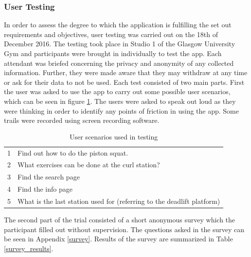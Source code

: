 \documentclass{l4proj}
\begin{document}
\subsubsection{User Testing}
In order to assess the degree to which the application is fulfilling the set out requirements and objectives, user testing was carried out on the 18th of December 2016. The testing took place in Studio 1 of the Glasgow University Gym and participants were brought in individually to test the app. Each attendant was briefed concerning the privacy and anonymity of any collected information. Further, they were made aware that they may withdraw at any time or ask for their data to not be used. Each test consisted of two main parts. First the user was asked to use the app to carry out some possible user scenarios, which can be seen in figure \ref{test_scenarios}. The users were asked to speak out loud as they were thinking in order to identify any points of friction in using the app. Some trails were recorded using screen recording software. 

\begin{table}[h]
\centering
\caption{User scenarios used in testing}
\label{test_scenarios}
\begin{tabular}{ll}
1 & Find out how to do the piston squat.\\
2 & What exercises can be done at the curl station? \\
3 & Find the search page \\
4 & Find the info page \\
5 & What is the last station used for (referring to the deadlift platform)
\end{tabular}
\end{table}

The second part of the trial consisted of a short anonymous survey which the participant filled out without supervision. The questions asked in the survey can be seen in Appendix \ref{survey}. Results of the survey are summarized in Table \ref{survey_results}.
\end{document}
